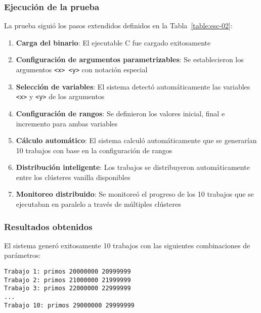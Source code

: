 \subsubsection{Ejecución de la prueba}
\noindent

La prueba siguió los pasos extendidos definidos en la Tabla~\ref{table:esc-02}:

\begin{enumerate}
	\item \textbf{Carga del binario}: El ejecutable C fue cargado exitosamente

	\item \textbf{Configuración de argumentos parametrizables}: Se establecieron los argumentos \texttt{<x> <y>} con notación especial

	\item \textbf{Selección de variables}: El sistema detectó automáticamente las variables \texttt{<x>} y \texttt{<y>} de los argumentos

	\item \textbf{Configuración de rangos}: Se definieron los valores inicial, final e incremento para ambas variables

	\item \textbf{Cálculo automático}: El sistema calculó automáticamente que se generarían 10 trabajos con base en la configuración de rangos

	\item \textbf{Distribución inteligente}: Los trabajos se distribuyeron automáticamente entre los clústeres vanilla disponibles

	\item \textbf{Monitoreo distribuido}: Se monitoreó el progreso de los 10 trabajos que se ejecutaban en paralelo a través de múltiples clústeres
\end{enumerate}

\subsubsection{Resultados obtenidos}
\noindent

El sistema generó exitosamente 10 trabajos con las siguientes combinaciones de parámetros:

\begin{verbatim}
Trabajo 1: primos 20000000 20999999
Trabajo 2: primos 21000000 21999999
Trabajo 3: primos 22000000 22999999
...
Trabajo 10: primos 29000000 29999999
\end{verbatim}

